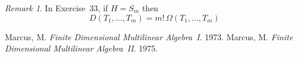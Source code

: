 \documentclass[letterpaper,12pt]{article}
\theoremstyle{definition}
\theoremstyle{remark}
\newtheorem*{rmk}{Remark}
\begin{document}
\begin{rmk}
In Exercise~33, if \(H=S_m\) then
\[D(T_1,\ldots,T_m)=m!\,\Omega(T_1,\ldots,T_m)\]
\end{rmk}

\newpage
\begin{thebibliography}{0}
 Marcus, M. \textit{Finite Dimensional Multilinear Algebra~I}. 1973.
 Marcus, M. \textit{Finite Dimensional Multilinear Algebra~II}. 1975.
\end{thebibliography}
\end{document}
